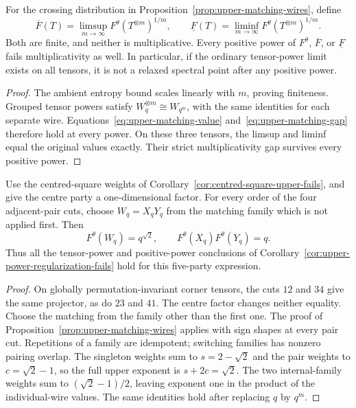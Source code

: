 \begin{corollary}
\label{cor:upper-power-regularization-fails}
For the crossing distribution in
Proposition~\ref{prop:upper-matching-wires}, define
\[
 \overline F(T)=\limsup_{m\to\infty}
                  F^\theta(T^{\otimes m})^{1/m},\qquad
 \underline F(T)=\liminf_{m\to\infty}
                  F^\theta(T^{\otimes m})^{1/m}.
\]
Both are finite, and neither is multiplicative. Every positive
power of $F^\theta$, $\overline F$, or $\underline F$ fails
multiplicativity as well. In particular, if the ordinary
tensor-power limit exists on all tensors, it is not a relaxed
spectral point after any positive power.
\end{corollary}
\begin{proof}
The ambient entropy bound scales linearly with $m$, proving
finiteness. Grouped tensor powers satisfy
$W_q^{\otimes m}\cong W_{q^m}$, with the same identities for
each separate wire. Equations~\eqref{eq:upper-matching-value}
and~\eqref{eq:upper-matching-gap} therefore hold at every power.
On these three tensors, the limsup and liminf equal the original
values exactly. Their strict multiplicativity gap survives every
positive power.
\end{proof}

\begin{corollary}
\label{cor:centred-upper-power-fails}
Use the centred-square weights of
Corollary~\ref{cor:centred-square-upper-fails}, and give the centre
party a one-dimensional factor. For every order of the four
adjacent-pair cuts, choose $W_q=X_qY_q$ from the matching family
which is not applied first. Then
\[
 F^\theta(W_q)=q^{\sqrt2},\qquad
 F^\theta(X_q)F^\theta(Y_q)=q.
\]
Thus all the tensor-power and positive-power conclusions of
Corollary~\ref{cor:upper-power-regularization-fails} hold for this
five-party expression.
\end{corollary}
\begin{proof}
On globally permutation-invariant corner tensors, the cuts $12$
and $34$ give the same projector, as do $23$ and $41$.
The centre factor changes neither equality. Choose the matching
from the family other than the first one. The proof of
Proposition~\ref{prop:upper-matching-wires} applies with sign
shapes at every pair cut. Repetitions of a family are idempotent;
switching families has nonzero pairing overlap. The singleton
weights sum to $s=2-\sqrt2$ and the pair weights to $c=\sqrt2-1$,
so the full upper exponent is $s+2c=\sqrt2$.
The two internal-family weights sum to $(\sqrt2-1)/2$,
leaving exponent one in the product of the individual-wire
values. The same identities hold after replacing $q$ by $q^m$.
\end{proof}

